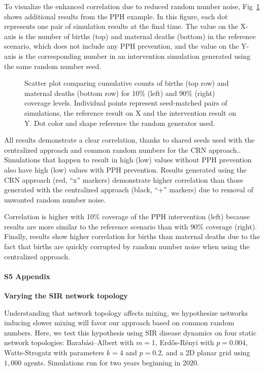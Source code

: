 \documentclass[10pt,letterpaper]{article}
\newcommand{\er}{Erd{\H o}s-R{\'e}nyi }
\newcommand{\ba}{Barab\'asi--Albert }
\begin{document}
To visualize the enhanced correlation due to reduced random number noise, Fig~\ref{f:pph_cor_slice} shows additional results from the PPH example. In this figure, each dot represents one pair of simulation results at the final time. The value on the X-axis is the number of births (top) and maternal deaths (bottom) in the reference scenario, which does not include any PPH prevention, and the value on the Y-axis is the corresponding number in an intervention simulation generated using the same random number seed.
\begin{figure}[h]%
\centering
\caption{Scatter plot comparing cumulative counts of births (top row) and maternal deaths (bottom row) for 10\% (left) and 90\% (right) coverage levels. Individual points represent seed-matched pairs of simulations, the reference result on X and the intervention result on Y. Dot color and shape reference the random generator used.}
\label{f:pph_cor_slice}
\end{figure}

All results demonstrate a clear correlation, thanks to shared seeds used with the centralized approach and common random numbers for the CRN approach.. Simulations that happen to result in high (low) values without PPH prevention also have high (low) values with PPH prevention. Results generated using the CRN approach (red, ``x'' markers) demonstrate higher correlation than those generated with the centralized approach (black, ``+'' markers) due to removal of unwanted random number noise.

Correlation is higher with 10\% coverage of the PPH intervention (left) because results are more similar to the reference scenario than with 90\% coverage (right). Finally, results show higher correlation for births than maternal deaths due to the fact that births are quickly corrupted by random number noise when using the centralized approach.



\paragraph*{S5 Appendix}\label{a:SIR_topology}
{\bf Varying the SIR network topology}

Understanding that network topology affects mixing, we hypothesize networks inducing slower mixing will favor our approach based on common random numbers. Here, we test this hypothesis using SIR disease dynamics on four static network topologies: \ba with $m=1$, \er with $p=0.004$, Watts-Strogatz with parameters $k=4$ and $p=0.2$, and a 2D planar grid using $1,000$ agents. Simulations run for two years beginning in 2020.
\end{document}
